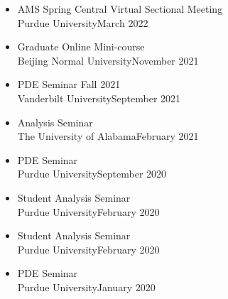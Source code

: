 \documentclass[12pt]{article}
\newenvironment{innerlist}[1][\enskip\textbullet]%
        {\begin{itemize}[#1,leftmargin=*,parsep=0pt,itemsep=0pt,topsep=0pt,partopsep=0pt]}
        {\end{itemize}}
\begin{document}
\begin{innerlist}
\item AMS Spring Central Virtual Sectional Meeting\\ Purdue University\hfill March 2022

\item Graduate Online Mini-course\\ Beijing Normal University\hfill November 2021

\item PDE Seminar Fall 2021\\ Vanderbilt University\hfill September 2021

\item Analysis Seminar\\ The University of Alabama\hfill February 2021

\item PDE Seminar\\ Purdue University\hfill September 2020

\item Student Analysis Seminar\\ Purdue University\hfill February 2020

\item Student Analysis Seminar\\ Purdue University\hfill February 2020

\item PDE Seminar\\ Purdue University\hfill January 2020



\end{innerlist}
\end{document}
